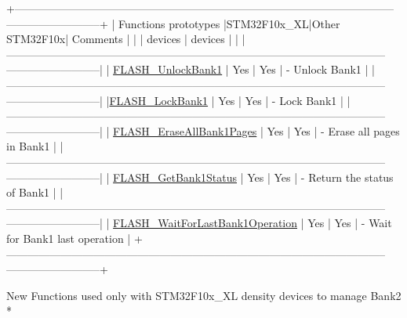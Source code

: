 \begin{DoxyCode}
                     
  +--------------------------------------------------------------------------------------------------------
      --------------------------+
  |       Functions prototypes         |STM32F10x\_XL|Other STM32F10x|    Comments                          
                                |
  |                                    |   devices  |  devices      |                                      
                                |
  |--------------------------------------------------------------------------------------------------------
      --------------------------|
  | \hyperlink{group___f_l_a_s_h___exported___functions_ga358c4b7e0ef20693ca62cc9d20c94a5a}{FLASH\_UnlockBank1}                  |    Yes     |      Yes      | - Unlock Bank1      
                                                 |
  |--------------------------------------------------------------------------------------------------------
      --------------------------|
  |\hyperlink{group___f_l_a_s_h___exported___functions_gafe4188ab9eb12c046970660f65a3faf9}{FLASH\_LockBank1}                     |    Yes     |      Yes      | - Lock Bank1          
                                               |
  |--------------------------------------------------------------------------------------------------------
      --------------------------|
  | \hyperlink{group___f_l_a_s_h___exported___functions_ga2036728450ee18e789b25fe3fd9c80ee}{FLASH\_EraseAllBank1Pages}           |    Yes     |      Yes      | - Erase all 
      pages in Bank1                                     |
  |--------------------------------------------------------------------------------------------------------
      --------------------------|
  | \hyperlink{group___f_l_a_s_h___exported___functions_ga9d5b76b75ef4c578cc45dc836a1929b6}{FLASH\_GetBank1Status}               |    Yes     |      Yes      | - Return the 
      status of Bank1                                   |
  |--------------------------------------------------------------------------------------------------------
      --------------------------|
  | \hyperlink{group___f_l_a_s_h___exported___functions_ga470d345c2ea4304f899aa988bdd23824}{FLASH\_WaitForLastBank1Operation}    |    Yes     |      Yes      | - Wait
       \textcolor{keywordflow}{for} Bank1 last operation                                |
  +--------------------------------------------------------------------------------------------------------
      --------------------------+

                                                                               
    New Functions used only with STM32F10x\_XL density devices to manage Bank2 *
                                                                               

\end{DoxyCode}
